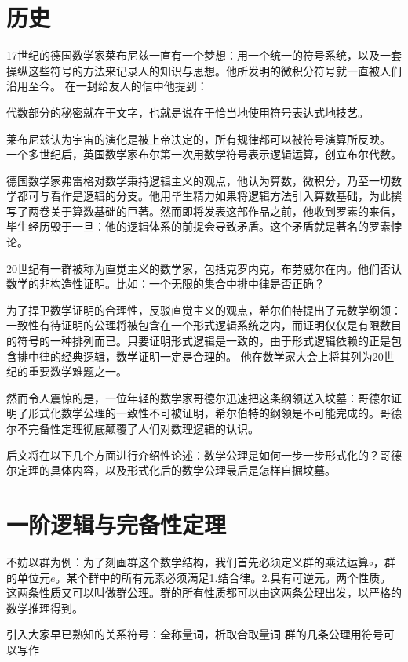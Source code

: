 
\section{历史\cite{his}}

     17世纪的德国数学家莱布尼兹一直有一个梦想：用一个统一的符号系统，以及一套操纵这些符号的方法来记录人的知识与思想。他所发明的微积分符号就一直被人们沿用至今。
     在一封给友人的信中他提到：

		 代数部分的秘密就在于文字，也就是说在于恰当地使用符号表达式地技艺。


     莱布尼兹认为宇宙的演化是被上帝决定的，所有规律都可以被符号演算所反映。
     一个多世纪后，英国数学家布尔第一次用数学符号表示逻辑运算，创立布尔代数。


		 德国数学家弗雷格对数学秉持逻辑主义的观点，他认为算数，微积分，乃至一切数学都可与看作是逻辑的分支。他用毕生精力如果将逻辑方法引入算数基础，为此撰写了两卷关于算数基础的巨著。然而即将发表这部作品之前，他收到罗素的来信，毕生经历毁于一旦：他的逻辑体系的前提会导致矛盾。这个矛盾就是著名的罗素悖论。

     20世纪有一群被称为直觉主义的数学家，包括克罗内克，布劳威尔在内。他们否认数学的非构造性证明。比如：一个无限的集合中排中律是否正确？

		 为了捍卫数学证明的合理性，反驳直觉主义的观点，希尔伯特提出了元数学纲领：一致性有待证明的公理将被包含在一个形式逻辑系统之内，而证明仅仅是有限数目的符号的一种排列而已。只要证明形式逻辑是一致的，由于形式逻辑依赖的正是包含排中律的经典逻辑，数学证明一定是合理的。
     他在数学家大会上将其列为20世纪的重要数学难题之一。

		 然而令人震惊的是，一位年轻的数学家哥德尔迅速把这条纲领送入坟墓：哥德尔证明了形式化数学公理的一致性不可被证明，希尔伯特的纲领是不可能完成的。哥德尔不完备性定理彻底颠覆了人们对数理逻辑的认识。


     后文将在以下几个方面进行介绍性论述：数学公理是如何一步一步形式化的？哥德尔定理的具体内容，以及形式化后的数学公理最后是怎样自掘坟墓。




\section{一阶逻辑与完备性定理\cite{book}}
      不妨以群为例：为了刻画群这个数学结构，我们首先必须定义群的乘法运算$\circ$，群的单位元$e$。某个群中的所有元素必须满足1.结合律。2.具有可逆元。两个性质。这两条性质又可以叫做群公理。群的所有性质都可以由这两条公理出发，以严格的数学推理得到。


       引入大家早已熟知的关系符号：全称量词，析取合取量词
       群的几条公理用符号可以写作

